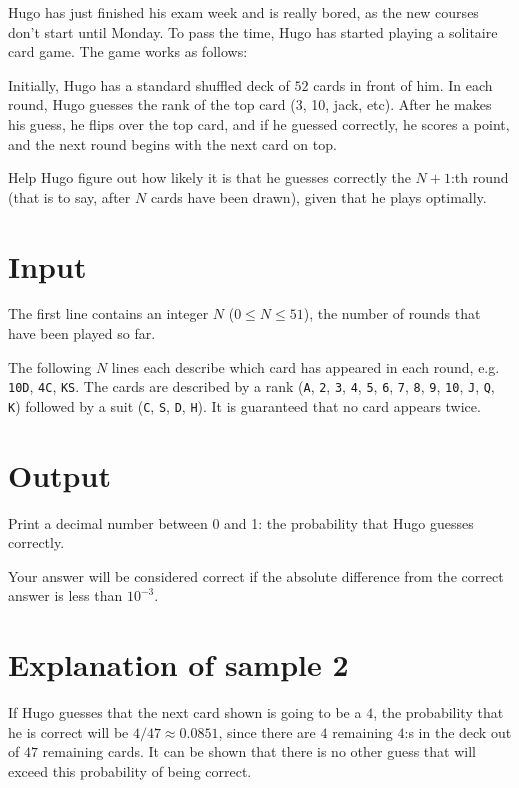 Hugo has just finished his exam week and is really bored, as the new courses don't start until Monday.
To pass the time, Hugo has started playing a solitaire card game. The game works as follows:

Initially, Hugo has a standard shuffled deck of $52$ cards in front of him. In each round, Hugo guesses the rank of the top card (3, 10, jack, etc).
After he makes his guess, he flips over the top card, and if he guessed correctly, he scores a point, and the next round begins with the next card on top.

Help Hugo figure out how likely it is that he guesses correctly the $N+1$:th round (that is to say, after $N$ cards have been drawn),
given that he plays optimally.

\section*{Input}
The first line contains an integer $N$ ($0 \le N \le 51$), the number of rounds that have been played so far.

The following $N$ lines each describe which card has appeared in each round, e.g. \texttt{10D}, \texttt{4C}, \texttt{KS}.
The cards are described by a rank (\texttt{A}, \texttt{2}, \texttt{3}, \texttt{4}, \texttt{5}, \texttt{6}, \texttt{7}, \texttt{8},
\texttt{9}, \texttt{10}, \texttt{J}, \texttt{Q}, \texttt{K}) followed by a suit (\texttt{C}, \texttt{S}, \texttt{D}, \texttt{H}).
It is guaranteed that no card appears twice.

\section*{Output}
Print a decimal number between 0 and 1: the probability that Hugo guesses correctly.

Your answer will be considered correct if the absolute difference from the correct answer is less than $10^{-3}$.

\section*{Explanation of sample 2}
If Hugo guesses that the next card shown is going to be a $4$, the probability that
he is correct will be $4/47 \approx 0.0851$, since there are $4$ remaining $4$:s in the deck out of $47$ remaining cards.
It can be shown that there is no other guess that will exceed this probability of being correct.

